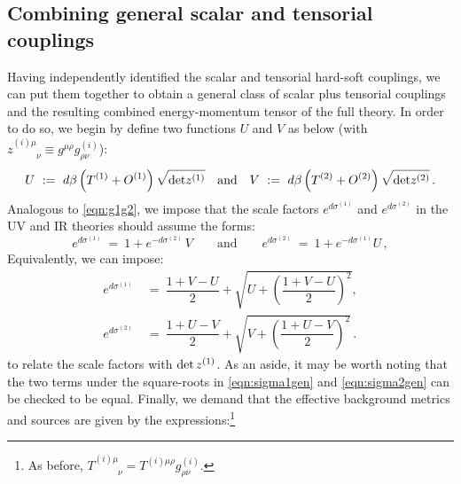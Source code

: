 \documentclass[prd,reprint,a4paper,showpacs,superscriptaddress,11pt,onecolumn,nofootinbib]{revtex4-1}
\renewcommand{\(}{\left(}
\renewcommand{\)}{\right)}
\newcommand{\6}{\partial}
\begin{document}
\subsection{Combining general scalar and tensorial couplings}
Having independently identified the scalar and tensorial hard-soft couplings, we can put them together to obtain a general class of scalar plus tensorial couplings and the resulting combined energy-momentum tensor of the full theory. In order to do so, we begin by define two functions $U$ and $V$ as below (with $z^{(i)\mu}_{\phantom{(i)\mu}\nu} \equiv g^{\mu\rho}g^{(i)}_{\rho\nu}$):
\begin{equation}\label{eqn:UV}
U ~ := ~ d\beta \left(T^{(1)}+ O^{(1)}\right)\sqrt{{\rm det}z^{(1)}} \quad \text{and} \quad V ~ :=~  d \beta \left(T^{(2)}+ O^{(2)}\right)\sqrt{{\rm det}z^{(2)}} \, .
\end{equation}
Analogous to \eqref{eqn:g1g2}, we impose that the scale factors $e^{d\sigma^{(1)}}$ and $e^{d\sigma^{(2)}}$ in the UV and IR theories should assume the forms:
\begin{equation}
e^{d\sigma^{(1)}} ~ = ~ 1 + e^{-d\sigma^{(2)}} \, V \qquad \text{and} \qquad e^{d\sigma^{(2)}} ~ = ~ 1 + e^{-d\sigma^{(1)}} U \, ,
\end{equation}
Equivalently, we can impose:
\begin{subequations}
\label{allequations}
\begin{align}
e^{d\sigma^{(1)}} ~ &= ~ \dfrac{1+V -U}{2} + \sqrt{U + \left( \dfrac{1+V -U}{2}\right)^2},\label{eqn:sigma1gen} \\ 
e^{d\sigma^{(2)}} ~ &= ~ \dfrac{1+U -V}{2} + \sqrt{V+ \left( \dfrac{1+U -V}{2}\right)^2} \, . \label{eqn:sigma2gen}
\end{align}
\end{subequations}
to relate the scale factors with ${\rm det}\, z^{(1)}$. As an aside, it may be worth noting that the two terms under the square-roots in \eqref{eqn:sigma1gen} and \eqref{eqn:sigma2gen} can be checked to be equal. Finally, we demand that the effective background metrics and sources are given by the expressions:\footnote{As before, $T^{(i)\mu}_{\phantom{(i)\mu}\nu}= T^{(i)\mu\rho}g^{(i)}_{\rho\nu}$.}
\end{document}

